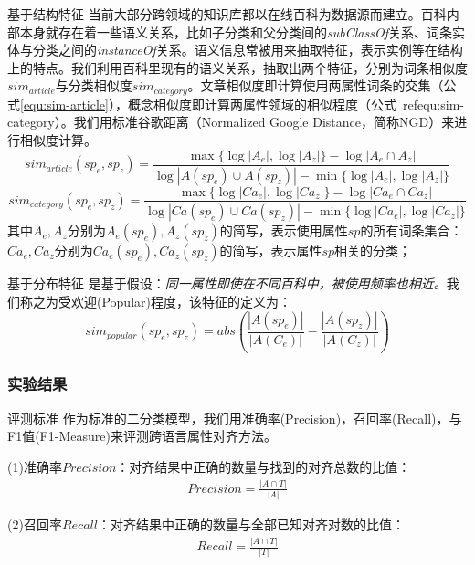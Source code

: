 {\heiti 基于结构特征}
当前大部分跨领域的知识库都以在线百科为数据源而建立。百科内部本身就存在着一些语义关系，比如子分类和父分类间的\textit{subClassOf}关系、词条实体与分类之间的\textit{instanceOf}关系。语义信息常被用来抽取特征\cite{wang2014cross}，表示实例等在结构上的特点。我们利用百科里现有的语义关系，抽取出两个特征，分别为词条相似度$sim_{article}$与分类相似度$sim_{category}$。文章相似度即计算使用两属性词条的交集（公式\ref{equ:sim-article}），概念相似度即计算两属性领域的相似程度（公式\ ref{equ:sim-category}）。我们用标准谷歌距离（Normalized Google Distance，简称NGD）来进行相似度计算。
\begin{equation}
\label{equ:sim-article}
sim_{article}(sp_e, sp_z) = \frac{\max\{\log |A_e|, \log |A_z|\} - \log|A_e \cap A_z|}
{\log |A(sp_e) \cup A(sp_z)| - \min\{\log |A_e|, \log |A_z|\}}
\end{equation}
\begin{equation}
\label{equ:sim-category}
sim_{category}(sp_e, sp_z) = \frac{\max\{\log |Ca_e|, \log |Ca_z|\} - \log|Ca_e \cap Ca_z|}
{\log |Ca(sp_e) \cup Ca(sp_z)| - \min\{\log |Ca_e|, \log |Ca_z|\}}
\end{equation}
其中$A_e, A_z$分别为$A_e(sp_e),A_z(sp_z)$的简写，表示使用属性$sp$的所有词条集合：$Ca_e, Ca_z$分别为$Ca_e(sp_e), Ca_z(sp_z)$的简写，表示属性$sp$相关的分类；

{\heiti 基于分布特征}
是基于假设：\textit{同一属性即使在不同百科中，被使用频率也相近。}我们称之为受欢迎(Popular)程度，该特征的定义为：
\begin{equation}
sim_{popular}(sp_e, sp_z) = abs(\frac{|A(sp_e)|}{|A(C_e)|} - \frac{|A(sp_z)|}{|A(C_z)|})
\end{equation}

\subsubsection{实验结果}

{\heiti 评测标准}
作为标准的二分类模型，我们用准确率(Precision)，召回率(Recall)，与F1值(F1-Measure)来评测跨语言属性对齐方法。

(1)准确率$Precision$：对齐结果中正确的数量与找到的对齐总数的比值：
\begin{align}
Precision = \frac { \left| A\cap T \right|  }{ \left| A \right|  }
\end{align}

(2)召回率$Recall$：对齐结果中正确的数量与全部已知对齐对数的比值：
\begin{align}
Recall = \frac { \left| A\cap T \right|  }{ \left| T \right|  }
\end{align}

